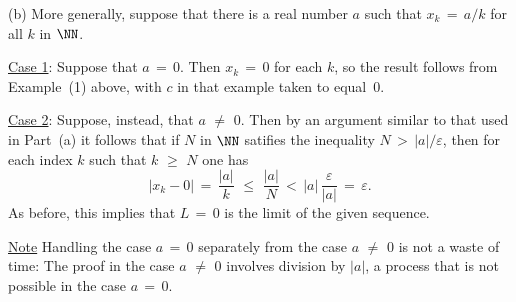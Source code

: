         (b) More generally, suppose that there is a real number $a$ such that $x_{k} \,=\, a/k$ for all $k$ in ${\NN}$.

        \h \underline{Case 1}: Suppose that $a \,=\, 0$. Then $x_{k} \,=\, 0$ for each $k$, so the result follows from Example~(1) above, with $c$ in that example taken to equal~$0$.

        \h \underline{Case 2}: Suppose, instead, that $a \,\,{\neq}\,\, 0$. Then by an argument similar to that used in Part~(a) it follows that
    if $N$ in ${\NN}$ satifies the inequality $N\,>\,|a|/{\varepsilon}$, then for each index $k$ such that $k\,\,{\geq}\,\,N$ one has
        \begin{displaymath}
        |x_{k} - 0| \,=\, \frac{|a|}{k}\,\,{\leq}\,\,\frac{|a|}{N}\,<\,
        |a|\,\frac{{\varepsilon}}{|a|} \,=\, {\varepsilon}.
        \end{displaymath}
    As before, this implies that $L \,=\, 0$ is the limit of the given sequence.

    \underline{Note} Handling the case $a \,=\, 0$ separately from the case $a \,\,{\neq}\,\, 0$ is not a waste of time:
    The proof in the case $a \,\,{\neq}\,\, 0$ involves division by $|a|$, a process that is not possible in the case $a \,=\, 0$.

\V

